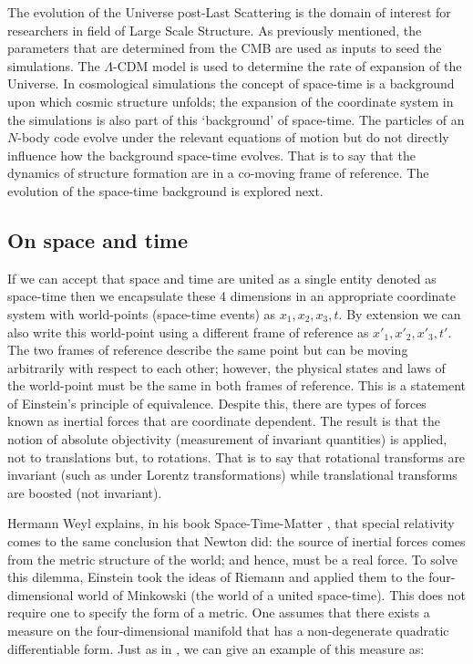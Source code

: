 The evolution of the Universe post-Last Scattering is the domain of interest for researchers in field of Large Scale Structure. As previously mentioned, the parameters that are determined from the CMB are used as inputs to seed the simulations. The $\Lambda$-CDM model is used to determine the rate of expansion of the Universe. In cosmological simulations the concept of space-time is a background upon which cosmic structure unfolds; the expansion of the coordinate system in the simulations is also part of this `background' of space-time. The particles of an $N$-body code evolve under the relevant equations of motion but do not directly influence how the background space-time evolves. That is to say that the dynamics of structure formation are in a co-moving frame of reference. The evolution of the space-time background is explored next.

\subsection{On space and time}
\label{on_spacetime}
If we can accept that space and time are united as a single entity denoted as space-time then we encapsulate these 4 dimensions in an appropriate coordinate system with world-points (space-time events) as $x_1, x_2, x_3, t$. By extension we can also write this world-point using a different frame of reference as $x'_1, x'_2, x'_3, t'$. The two frames of reference describe the same point but can be moving arbitrarily with respect to each other; however, the physical states and laws of the world-point must be the same in both frames of reference. This is a statement of Einstein's principle of equivalence. Despite this, there are types of forces known as inertial forces that are coordinate dependent. The result is that the notion of absolute objectivity (measurement of invariant quantities) is applied, not to translations but, to rotations. That is to say that rotational transforms are invariant (such as under Lorentz transformations) while translational transforms are boosted (not invariant).

Hermann Weyl explains, in his book Space-Time-Matter \citep{bib_weyl}, that special relativity comes to the same conclusion that Newton did: the source of inertial forces comes from the metric structure of the world; and hence, must be a real force. To solve this dilemma, Einstein took the ideas of Riemann and applied them to the four-dimensional world of Minkowski (the world of a united space-time). This does not require one to specify the form of a metric. One assumes that there exists a measure on the four-dimensional manifold that has a non-degenerate quadratic differentiable form. Just as in \citep{bib_weyl}, we can give an example of this measure as:

